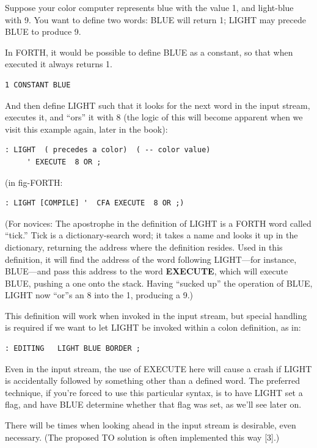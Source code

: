 Suppose your color computer represents blue with the value 1, and
light-blue with 9. You want to define two words: BLUE will return 1;
LIGHT may precede BLUE to produce 9.

In FORTH, it would be possible to define BLUE as a constant, so
that when executed it always returns 1.

\begin{verbatim}
1 CONSTANT BLUE
\end{verbatim}

And then define LIGHT such that it looks for the next word in the input
stream, executes it, and ``ors'' it with 8 (the logic of this will become
apparent when we visit this example again, later in the book):
\begin{verbatim}
: LIGHT  ( precedes a color)  ( -- color value)
     ' EXECUTE  8 OR ;
\end{verbatim}
(in fig-FORTH:
\begin{verbatim}
: LIGHT [COMPILE] '  CFA EXECUTE  8 OR ;)
\end{verbatim}
(For novices: The apostrophe in the definition of LIGHT is a FORTH
word called ``tick.'' Tick is a dictionary-search word; it takes a name and
looks it up in the dictionary, returning the address where the definition
resides. Used in this definition, it will find the address of the word
following LIGHT---for instance, BLUE---and pass this address to the word
\textbf{EXECUTE}, which will execute BLUE, pushing a one onto the stack.
Having ``sucked up'' the operation of BLUE, LIGHT now ``or''s an 8 into
the 1, producing a 9.)

This definition will work when invoked in the input stream, but special
handling is required if we want to let LIGHT be invoked within a
colon definition, as in:
\begin{verbatim}
: EDITING   LIGHT BLUE BORDER ;
\end{verbatim}
Even in the input stream, the use of EXECUTE here will cause
a crash if LIGHT is accidentally followed by something other than a
defined word.  The preferred technique, if you're forced to use this
particular syntax, is to have LIGHT set a flag, and have BLUE
determine whether that flag was set, as we'll see later on.

There will be times when looking ahead in the input stream is desirable,
even necessary. (The proposed TO solution is often implemented
this way [3].)

